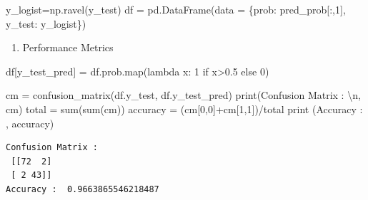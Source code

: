 \documentclass[
  11pt,
  letterpaper,
  DIV=11,
  numbers=noendperiod]{scrartcl}
\newenvironment{Shaded}{\begin{snugshade}}{\end{snugshade}}
\newcommand{\BuiltInTok}[1]{\textcolor[rgb]{0.00,0.23,0.31}{#1}}
\newcommand{\CharTok}[1]{\textcolor[rgb]{0.13,0.47,0.30}{#1}}
\newcommand{\ControlFlowTok}[1]{\textcolor[rgb]{0.00,0.23,0.31}{#1}}
\newcommand{\DecValTok}[1]{\textcolor[rgb]{0.68,0.00,0.00}{#1}}
\newcommand{\FloatTok}[1]{\textcolor[rgb]{0.68,0.00,0.00}{#1}}
\newcommand{\KeywordTok}[1]{\textcolor[rgb]{0.00,0.23,0.31}{#1}}
\newcommand{\NormalTok}[1]{\textcolor[rgb]{0.00,0.23,0.31}{#1}}
\newcommand{\OperatorTok}[1]{\textcolor[rgb]{0.37,0.37,0.37}{#1}}
\newcommand{\StringTok}[1]{\textcolor[rgb]{0.13,0.47,0.30}{#1}}
\providecommand{\tightlist}{%
  \setlength{\itemsep}{0pt}\setlength{\parskip}{0pt}}\usepackage{longtable,booktabs,array}
\begin{document}
\begin{Shaded}
\begin{Highlighting}[]
\NormalTok{y\_logist}\OperatorTok{=}\NormalTok{np.ravel(y\_test)}
\NormalTok{df }\OperatorTok{=}\NormalTok{ pd.DataFrame(data }\OperatorTok{=}\NormalTok{ \{}\StringTok{\textquotesingle{}prob\textquotesingle{}}\NormalTok{: pred\_prob[:,}\DecValTok{1}\NormalTok{], }\StringTok{\textquotesingle{}y\_test\textquotesingle{}}\NormalTok{: y\_logist\})}
\end{Highlighting}
\end{Shaded}

\begin{enumerate}
\def\labelenumi{\arabic{enumi}.}
\setcounter{enumi}{9}
\tightlist
\item
  Performance Metrics
\end{enumerate}

\begin{Shaded}
\begin{Highlighting}[]
\NormalTok{df[}\StringTok{\textquotesingle{}y\_test\_pred\textquotesingle{}}\NormalTok{] }\OperatorTok{=}\NormalTok{ df.prob.}\BuiltInTok{map}\NormalTok{(}\KeywordTok{lambda}\NormalTok{ x: }\DecValTok{1} \ControlFlowTok{if}\NormalTok{ x}\OperatorTok{\textgreater{}}\FloatTok{0.5} \ControlFlowTok{else} \DecValTok{0}\NormalTok{)}
\end{Highlighting}
\end{Shaded}

\begin{Shaded}
\begin{Highlighting}[]
\NormalTok{cm }\OperatorTok{=}\NormalTok{ confusion\_matrix(df.y\_test, df.y\_test\_pred)}
\BuiltInTok{print}\NormalTok{(}\StringTok{\textquotesingle{}Confusion Matrix : }\CharTok{\textbackslash{}n}\StringTok{\textquotesingle{}}\NormalTok{, cm)}
\NormalTok{total }\OperatorTok{=} \BuiltInTok{sum}\NormalTok{(}\BuiltInTok{sum}\NormalTok{(cm))}
\NormalTok{accuracy }\OperatorTok{=}\NormalTok{ (cm[}\DecValTok{0}\NormalTok{,}\DecValTok{0}\NormalTok{]}\OperatorTok{+}\NormalTok{cm[}\DecValTok{1}\NormalTok{,}\DecValTok{1}\NormalTok{])}\OperatorTok{/}\NormalTok{total}
\BuiltInTok{print}\NormalTok{ (}\StringTok{\textquotesingle{}Accuracy : \textquotesingle{}}\NormalTok{, accuracy)}
\end{Highlighting}
\end{Shaded}

\begin{verbatim}
Confusion Matrix : 
 [[72  2]
 [ 2 43]]
Accuracy :  0.9663865546218487
\end{verbatim}
\end{document}
